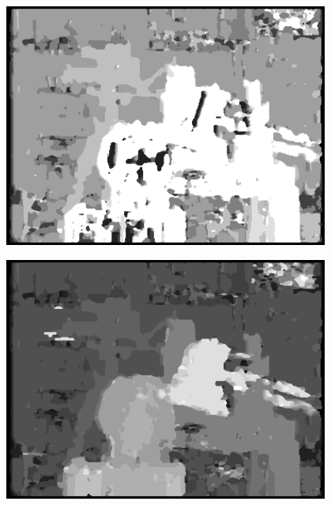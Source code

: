 \documentclass[a4paper]{scrartcl}
\begin{document}
\vspace{1cm}
\begin{minipage}{0.8\textwidth}
  \centering
  \includegraphics[width=0.8\textwidth]{images/disparity-r3-ssd-d8-m1.png}
  \label{fig:disparity-r3-ssd-d8-m1}
\end{minipage}

\vspace{1cm}
\begin{minipage}{0.8\textwidth}
  \centering
  \includegraphics[width=0.8\textwidth]{images/disparity-r3-ssd-d16-m1.png}
  \label{fig:disparity-r3-ssd-d16-m1}
\end{minipage}
\end{document}
